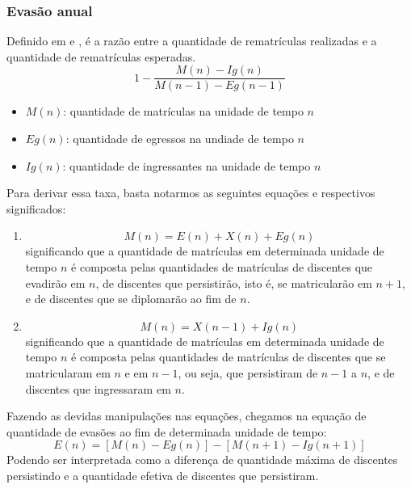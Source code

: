 \documentclass{report}
\begin{document}
\subsubsection{Evasão anual}

Definido em \cite{esclarecimentos_calculos} e \cite{mudanca_calculos}, é a razão entre a quantidade de rematrículas realizadas e a quantidade de rematrículas esperadas.
\begin{equation}
1 - \frac{M(n) - Ig(n)}{M(n-1) - Eg(n-1)}
\end{equation}
\begin{itemize}
\item $M(n)$: quantidade de matrículas na unidade de tempo $n$
\item $Eg(n)$: quantidade de egressos na undiade de tempo $n$
\item $Ig(n)$: quantidade de ingressantes na unidade de tempo $n$
\end{itemize}

Para derivar essa taxa, basta notarmos as seguintes equações e respectivos significados:
\begin{enumerate}
\item 
\begin{equation}
M(n) = E(n) + X(n) + Eg(n)
\end{equation}
significando que a quantidade de matrículas em determinada unidade de tempo $n$ é composta pelas quantidades de matrículas de discentes que evadirão em $n$, de discentes que persistirão, isto é, se matricularão em $n+1$, e de discentes que se diplomarão ao fim de $n$.
\item 
\begin{equation}
M(n) = X(n-1) + Ig(n)
\end{equation}
significando que a quantidade de matrículas em determinada unidade de tempo $n$ é composta pelas quantidades de matrículas de discentes que se matricularam em $n$ e em $n-1$, ou seja, que persistiram de $n-1$ a $n$, e de discentes que ingressaram em $n$.
\end{enumerate}

Fazendo as devidas manipulações nas equações, chegamos na equação de quantidade de evasões ao fim de determinada unidade de tempo:
\begin{equation}
E(n) = [M(n) - Eg(n)] - [M(n+1) - Ig(n+1)]
\end{equation}
Podendo ser interpretada como a diferença de quantidade máxima de discentes persistindo e a quantidade efetiva de discentes que persistiram.
\end{document}
